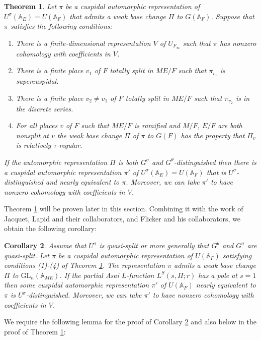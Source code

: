\documentclass[12pt]{amsart}
\newtheorem{thm}{Theorem}[section]
\newtheorem{cor}[thm]{Corollary}
\theoremstyle{remark}
\numberwithin{equation}{section}
\newcommand{\A}{\mathbb{A}}
\newcommand{\GL}{\mathrm{GL}}
\theoremstyle{definition}
\numberwithin{equation}{subsection}
\begin{document}
\begin{thm} \label{main-thm} Let $\pi$ be a cuspidal automorphic representation of $U^{\sigma}(\A_E)=U(\A_F)$ that admits a weak base change $\Pi$ to $G(\A_F)$.
Suppose that $\pi$ satisfies the following conditions:
\begin{enumerate}
\item There is a finite-dimensional representation $V$ of $U_{F_{\infty}}$ such that $\pi$ has
nonzero cohomology with coefficients in $V$.
\item There is a finite place $v_1$ of $F$ totally split in $ME/F$ such that $\pi_{v_1}$ is supercuspidal.
\item There is a finite place $v_2 \neq v_1$ of $F$ totally split in $ME/F$ such that $\pi_{v_2}$ is in the discrete series.
\item For all places $v$ of $F$ such that $ME/F$ is ramified and $M/F$, $E/F$ are both nonsplit at $v$ the weak base change $\Pi$ of $\pi$ to $G(F)$ has the property that $\Pi_v$ is relatively $\tau$-regular.
\end{enumerate}

If the automorphic representation $\Pi$ is both $G^{\sigma}$
and $G^{\theta}$-distinguished then there is a cuspidal automorphic representation $\pi'$ of $U^{\sigma}(\A_E)=U(\A_F)$ that is $U^{\sigma}$-distinguished and
nearly equivalent to $\pi$.  Moreover, we can take $\pi'$ to have nonzero cohomology with coefficients in $V$.
\end{thm}

  Theorem \ref{main-thm} will be proven later in this section.  Combining it with the work of Jacquet, Lapid and their collaborators, and Flicker and his collaborators, we obtain the following corollary:

\begin{cor} \label{main-cor} Assume that $U^{\sigma}$ is quasi-split or more generally that $G^{\theta}$ and $G^{\sigma}$ are quasi-split. Let $\pi$ be a cuspidal automorphic
representation of $U(\A_F)$ satisfying conditions (1)-(4) of Theorem
\ref{main-thm}.
The representation $\pi$ admits a weak base change $\Pi$ to $\GL_n(\A_{ME})$. If the partial Asai $L$-function $L^S(s,\Pi;r)$ has a pole at $s=1$ then some cuspidal automorphic representation
$\pi'$ of $U(\A_F)$ nearly equivalent to $\pi$ is $U^{\sigma}$-distinguished.
 Moreover, we can take $\pi'$ to have nonzero cohomology
with coefficients in $V$.
\end{cor}

We require the following lemma for the proof of Corollary \ref{main-cor} and also below in the proof of Theorem \ref{main-thm}:
\end{document}
